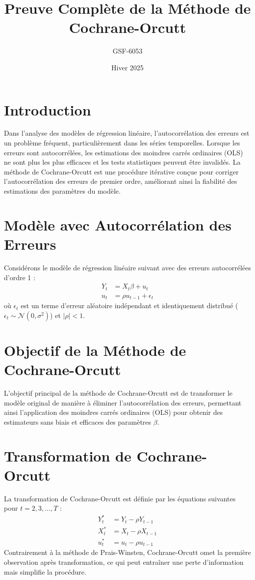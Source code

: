 \documentclass[14pt]{extarticle} %
\title{\textbf{Preuve Complète de la Méthode de Cochrane-Orcutt}}
\author{GSF-6053}
\date{Hiver 2025}
\theoremstyle{definition}
\theoremstyle{plain}
\begin{document}
\maketitle

\tableofcontents

\newpage

\section{Introduction}
Dans l'analyse des modèles de régression linéaire, l'autocorrélation des erreurs est un problème fréquent, particulièrement dans les séries temporelles. Lorsque les erreurs sont autocorrélées, les estimations des moindres carrés ordinaires (OLS) ne sont plus les plus efficaces et les tests statistiques peuvent être invalidés. La méthode de Cochrane-Orcutt est une procédure itérative conçue pour corriger l'autocorrélation des erreurs de premier ordre, améliorant ainsi la fiabilité des estimations des paramètres du modèle.

\section{Modèle avec Autocorrélation des Erreurs}
Considérons le modèle de régression linéaire suivant avec des erreurs autocorrélées d'ordre 1 :
\begin{align}
Y_t &= X_t \beta + u_t \label{eq:CO_model_original} \\
u_t &= \rho u_{t-1} + \epsilon_t \label{eq:CO_autocorr_error}
\end{align}
où \( \epsilon_t \) est un terme d'erreur aléatoire indépendant et identiquement distribué (\( \epsilon_t \sim \mathcal{N}(0, \sigma^2) \)) et \( |\rho| < 1 \).

\section{Objectif de la Méthode de Cochrane-Orcutt}
L'objectif principal de la méthode de Cochrane-Orcutt est de transformer le modèle original de manière à éliminer l'autocorrélation des erreurs, permettant ainsi l'application des moindres carrés ordinaires (OLS) pour obtenir des estimateurs sans biais et efficaces des paramètres \( \beta \).

\section{Transformation de Cochrane-Orcutt}
La transformation de Cochrane-Orcutt est définie par les équations suivantes pour \( t = 2, 3, \dots, T \) :
\begin{align}
Y_t^* &= Y_t - \rho Y_{t-1} \\
X_t^* &= X_t - \rho X_{t-1} \\
u_t^* &= u_t - \rho u_{t-1}
\end{align}
Contrairement à la méthode de Prais-Winsten, Cochrane-Orcutt omet la première observation après transformation, ce qui peut entraîner une perte d'information mais simplifie la procédure.
\end{document}
